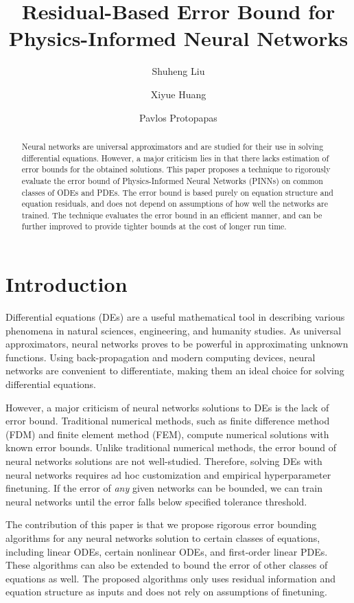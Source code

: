 \documentclass[accepted]{uai2023}
\title{Residual-Based Error Bound for Physics-Informed Neural Networks}
\author[1]{Shuheng Liu}
\author[2]{Xiyue Huang}
\author[3]{Pavlos Protopapas}
\affil[1, 3]{
    Institute for Applied Computational Science\\
    Harvard University\\
    Cambridge, Massachusetts, USA
}
\affil[2]{
    Data Science Institute\\
    Columbia University\\
    New York, New York, USA
}
\begin{document}
\maketitle

\begin{abstract}
    Neural networks are universal approximators and are studied for their use in solving differential equations.
    However, a major criticism lies in that there lacks estimation of error bounds for the obtained solutions.
    This paper proposes a technique to rigorously evaluate the error bound of Physics-Informed Neural Networks (PINNs) on common classes of ODEs and PDEs.
    The error bound is based purely on equation structure and equation residuals, and does not depend on assumptions of how well the networks are trained.
    The technique evaluates the error bound in an efficient manner, and can be further improved to provide tighter bounds at the cost of longer run time.
\end{abstract}

\section{Introduction}
    Differential equations (DEs) are a useful mathematical tool in describing various phenomena in natural sciences, engineering, and humanity studies. 
    As universal approximators, neural networks proves to be powerful in approximating unknown functions. 
    Using back-propagation and modern computing devices, neural networks are convenient to differentiate, making them an ideal choice for solving differential equations.

    However, a major criticism of neural networks solutions to DEs is the lack of error bound. 
    Traditional numerical methods, such as finite difference method (FDM) and finite element method (FEM), compute numerical solutions with known error bounds.
    Unlike traditional numerical methods, the error bound of neural networks solutions are not well-studied.
    Therefore, solving DEs with neural networks requires ad hoc customization and empirical hyperparameter finetuning.
    If the error of \textit{any} given networks can be bounded, we can train neural networks until the error falls below specified tolerance threshold.

    The contribution of this paper is that we propose rigorous error bounding algorithms for any neural networks solution to certain classes of equations, including linear ODEs, certain nonlinear ODEs, and first-order linear PDEs.
    These algorithms can also be extended to bound the error of other classes of equations as well.
    The proposed algorithms only uses residual information and equation structure as inputs and does not rely on assumptions of finetuning.
\end{document}
